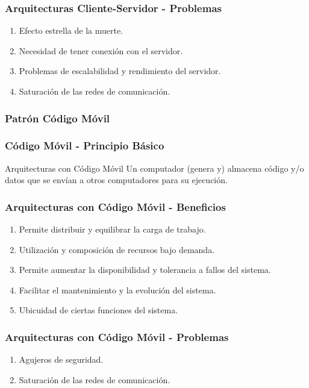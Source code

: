 \documentclass[a4paper,slidestop,xcolor=pst,dvips,blue]{beamer}
\begin{document}
\begin{frame}[c]
    \frametitle{Arquitecturas Cliente-Servidor - Problemas}
    \begin{enumerate}[<+->]
        \item Efecto estrella de la muerte.
        \item Necesidad de tener conexión con el servidor.
        \item Problemas de escalabilidad y rendimiento del servidor.
        \item Saturación de las redes de comunicación.
    \end{enumerate}
\end{frame}

\subsubsection{Patrón Código Móvil}

\begin{frame}[c]
    \frametitle{Código Móvil - Principio Básico}
    \begin{block}{Arquitecturas con Código Móvil}
        Un computador (genera y) almacena código y/o datos que se envían a otros computadores para su ejecución.
    \end{block}
\end{frame}

\begin{frame}[c]
    \frametitle{Arquitecturas con Código Móvil - Beneficios}
    \begin{enumerate}[<+->]
        \item Permite distribuir y equilibrar la carga de trabajo.
        \item Utilización y composición de recursos bajo demanda.
        \item Permite aumentar la disponibilidad y tolerancia a fallos del sistema.
        \item Facilitar el mantenimiento y la evolución del sistema.
        \item Ubicuidad de ciertas funciones del sistema.
    \end{enumerate}
\end{frame}

\begin{frame}[c]
    \frametitle{Arquitecturas con Código Móvil - Problemas}
    \begin{enumerate}[<+->]
        \item Agujeros de seguridad.
        \item Saturación de las redes de comunicación.
    \end{enumerate}
\end{frame}
\end{document}
